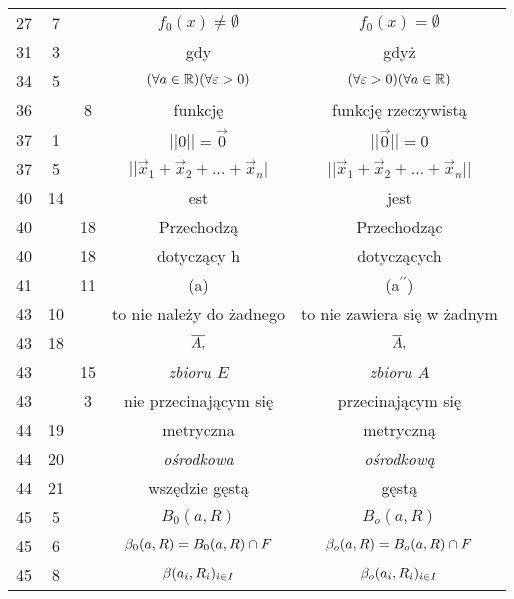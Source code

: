\documentclass[a4paper,11pt]{article}
\newcommand{\veps}{\varepsilon}
\newcommand{\ld}{\ldots}
\begin{document}
\begin{center}
\begin{tabular}{|c|c|c|c|c|}
    27  &  7 & & $f_{ 0 }( x ) \neq \emptyset$ & $f_{ 0 }( x )
                                                 = \emptyset$ \\
    31  &  3 & & gdy & gdyż \\
    34  &  5 & & $( \forall a \in \R ) ( \forall \veps > 0 )$
           & $( \forall \veps > 0 ) ( \forall a \in \R )$ \\
    36  & &  8 & funkcję & funkcję rzeczywistą \\
    37  &  1 & & $|| 0 || = \vec{ 0 }$ & $|| \vec{ 0 } || = 0$ \\
    37  &  5 & & $|| \vec{ x }_{ 1 } + \vec{ x }_{ 2 } + \ld
                 + \vec{ x }_{ n } |$
           & $|| \vec{ x }_{ 1 } + \vec{ x }_{ 2 } + \ld
             + \vec{ x }_{ n } ||$ \\
    40  & 14 & & est & jest \\
    40  & & 18 & Przechodzą & Przechodząc \\
    40  & & 18 & dotyczący h & dotyczących \\
    41  & & 11 & (a) & (a$^{ \prime \prime }$) \\
    43  & 10 & & to nie należy do żadnego & to nie zawiera się w żadnym \\
    43  & 18 & & $\overline{A,}$ & $\overline{A},$ \\
    43  & & 15 & \emph{zbioru $E$} & \emph{zbioru $A$} \\
    43  & &  3 & nie przecinającym się & przecinającym się \\
    44  & 19 & & metryczna & metryczną \\
    44  & 20 & & \emph{ośrodkowa} & \emph{ośrodkową} \\
    44  & 21 & & wszędzie gęstą & gęstą \\
    45  &  5 & & $B_{ 0 }( a, R )$ & $B_{ o }( a, R )$ \\
    45  &  6 & & $\beta_{ 0 }( a, R ) = B_{ 0 }( a, R ) \cap F$
           & $\beta_{ o }( a, R ) = B_{ o }( a, R ) \cap F$ \\
    45  &  8 & & $\beta( a_{ i }, R_{ i } )_{ i \in I}$
           & $\beta_{ o }( a_{ i }, R_{ i } )_{ i \in I}$ \\
    \hline
  \end{tabular}


\end{center}
\end{document}
